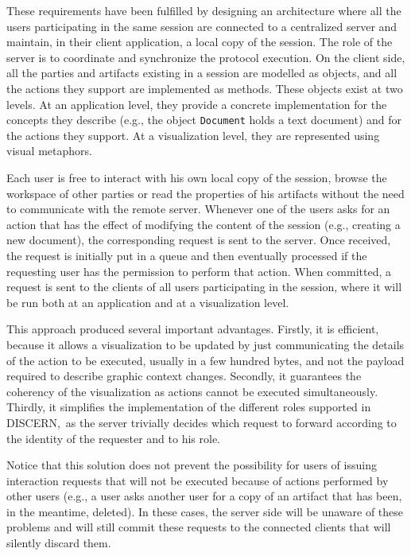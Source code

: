 \documentclass[conference]{IEEEtran}
\def\disgrace{DISCERN}
\begin{document}
These requirements have been fulfilled by designing an architecture
where all the users participating in the same session are connected to
a centralized server and maintain, in their client application, a
local copy of the session. The role of the server is to coordinate and
synchronize the protocol execution. On the client side, all the
parties and artifacts existing in a session are modelled as objects,
and all the actions they support are implemented as methods. These
objects exist at two levels. At an application level, they provide a
concrete implementation for the concepts they describe (e.g., the
object {\tt Document} holds a text document) and for the actions they
support. At a visualization level, they are represented using visual
metaphors.

Each user is free to interact with his own local copy of the session,
browse the workspace of other parties or read the properties of his
artifacts without the need to communicate with the remote
server. Whenever one of the users asks for an action that has the
effect of modifying the content of the session (e.g., creating a new
document), the corresponding request is sent to the server. Once
received, the request is initially put in a queue and then eventually
processed if the requesting user has the permission to perform that
action. When committed, a request is sent to the clients of all users
participating in the session, where it will be run both at an
application and at a visualization level.

This approach produced several important advantages. Firstly, it is
efficient, because it allows a visualization to be updated by just
communicating the details of the action to be executed, usually in a
few hundred bytes, and not the payload required to describe graphic
context changes. Secondly, it guarantees the coherency of the
visualization as actions cannot be executed simultaneously. Thirdly,
it simplifies the implementation of the different roles supported in
\disgrace,\ as the server trivially decides which request to forward
according to the identity of the requester and to his role.

Notice that this solution does not prevent the possibility for users
of issuing interaction requests that will not be executed because of
actions performed by other users (e.g., a user asks another user for a
copy of an artifact that has been, in the meantime, deleted). In these
cases, the server side will be unaware of these problems and will
still commit these requests to the connected clients that will
silently discard them.
\end{document}
